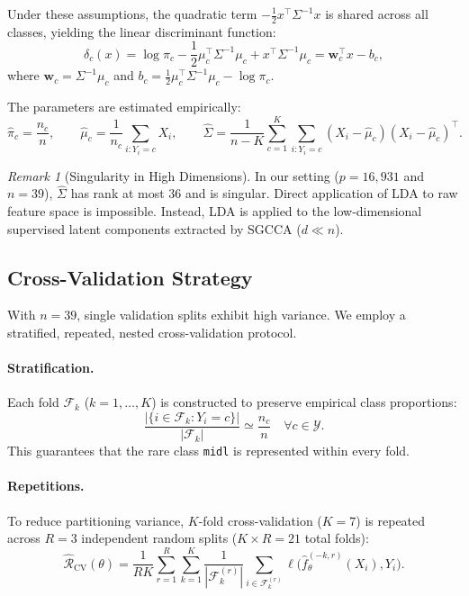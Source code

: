 \documentclass[a4paper,11pt]{paper}
\theoremstyle{plain}
\theoremstyle{definition}
\theoremstyle{remark}
\newtheorem{remark}[theorem]{Remark}
\begin{document}
Under these assumptions, the quadratic term $-\frac{1}{2}x^\top \Sigma^{-1} x$ is shared across all classes, yielding the linear discriminant function:
$$\delta_c(x) = \log \pi_c - \frac{1}{2}\mu_c^\top \Sigma^{-1}\mu_c + x^\top \Sigma^{-1}\mu_c = \mathbf{w}_c^\top x - b_c,$$
where $\mathbf{w}_c = \Sigma^{-1}\mu_c$ and $b_c = \frac{1}{2}\mu_c^\top \Sigma^{-1}\mu_c - \log \pi_c$.

The parameters are estimated empirically:
$$\hat \pi_c = \frac{n_c}{n}, \qquad \hat \mu_c = \frac{1}{n_c}\sum_{i : Y_i = c} X_i, \qquad \hat \Sigma = \frac{1}{n-K}\sum_{c=1}^K \sum_{i : Y_i = c} (X_i - \hat \mu_c)(X_i - \hat \mu_c)^\top.$$

\begin{remark}[Singularity in High Dimensions]
    In our setting ($p = 16{,}931$ and $n = 39$), $\hat \Sigma$ has rank at most $36$ and is singular. Direct application of LDA to raw feature space is impossible. Instead, LDA is applied to the low-dimensional supervised latent components extracted by SGCCA ($d \ll n$).
\end{remark}

\subsection{Cross-Validation Strategy}
\label{sec:cv}

With $n = 39$, single validation splits exhibit high variance. We employ a stratified, repeated, nested cross-validation protocol.

\paragraph{Stratification.}
Each fold $\mathcal{F}_k$ ($k = 1, \dots, K$) is constructed to preserve empirical class proportions:
$$\frac{|\{i \in \mathcal{F}_k : Y_i = c\}|}{|\mathcal{F}_k|} \simeq \frac{n_c}{n} \quad \forall c \in \mathcal{Y}.$$
This guarantees that the rare class \texttt{midl} is represented within every fold.

\paragraph{Repetitions.}
To reduce partitioning variance, $K$-fold cross-validation ($K = 7$) is repeated across $R = 3$ independent random splits ($K \times R = 21$ total folds):
$$\widehat{\mathcal{R}}_{\mathrm{CV}}(\theta) = \frac{1}{RK} \sum_{r=1}^R \sum_{k=1}^K \frac{1}{|\mathcal{F}_k^{(r)}|} \sum_{i \in \mathcal{F}_k^{(r)}} \ell\big(\hat f^{(-k,r)}_\theta(X_i), Y_i\big).$$
\end{document}
